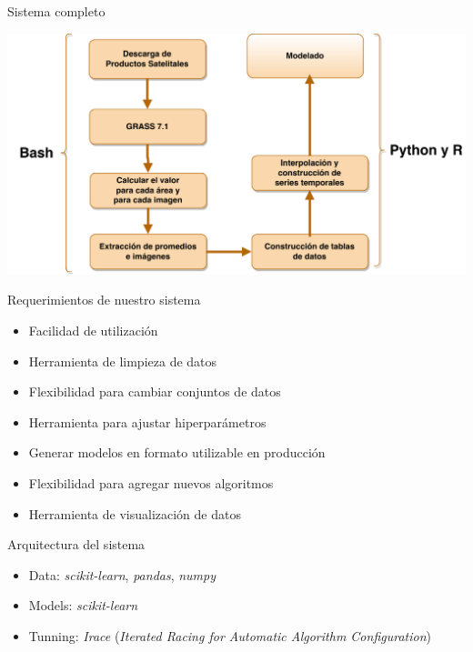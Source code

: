 \documentclass[10pt]{beamer}
\begin{document}
\begin{frame}{Sistema completo}
  \begin{center}
    \includegraphics[width=1\textwidth]{sistema_datos}
  \end{center}
\end{frame}


\begin{frame}{Requerimientos de nuestro sistema}
  \begin{itemize}
    \item Facilidad de utilización
    \item Herramienta de limpieza de datos
    \item Flexibilidad para cambiar conjuntos de datos
    \item Herramienta para ajustar hiperparámetros
    \item Generar modelos en formato utilizable en producción
    \item Flexibilidad para agregar nuevos algoritmos
    \item Herramienta de visualización de datos
  \end{itemize}
\end{frame}

\begin{frame}{Arquitectura del sistema}
  \begin{itemize}
    \item Data: \textit{scikit-learn}, \textit{pandas}, \textit{numpy}
    \item Models: \textit{scikit-learn}
    \item Tunning: \textit{Irace} (\textit{Iterated Racing for Automatic Algorithm Configuration})
  \end{itemize}
\end{frame}
\end{document}
